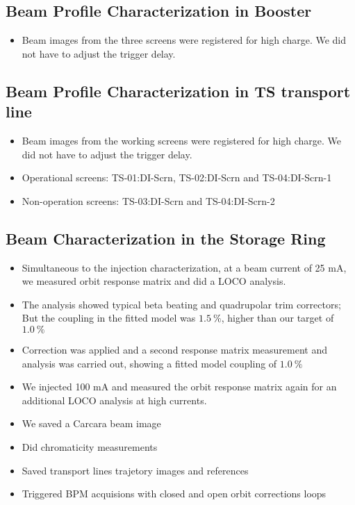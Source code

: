 \documentclass{article}
\begin{document}
\subsection{Beam Profile Characterization in Booster}
\begin{itemize}
    \item Beam images from the three screens were registered for high charge. We did not have to adjust the trigger delay.
\end{itemize}

\subsection{Beam Profile Characterization in TS transport line}
\begin{itemize}
    \item Beam images from the working screens were registered for high charge. We did not have to adjust the trigger delay.
    \item Operational screens: TS-01:DI-Scrn, TS-02:DI-Scrn and TS-04:DI-Scrn-1
    \item Non-operation screens: TS-03:DI-Scrn and TS-04:DI-Scrn-2
\end{itemize}

\subsection{Beam Characterization in the Storage Ring}
\begin{itemize}
    \item Simultaneous to the injection characterization, at a beam current of 25 mA, we measured orbit response matrix and did a LOCO analysis.
    \item The analysis showed typical beta beating and quadrupolar trim correctors; But the coupling in the fitted model was $\SI{1.5}{\percent}$, higher than our target of $\SI{1.0}{\percent}$
    \item Correction was applied and a second response matrix measurement and analysis was carried out, showing a fitted model coupling of $\SI{1.0}{\percent}$
    \item We injected 100 mA and measured the orbit response matrix again for an additional LOCO analysis at high currents.
    \item We saved a Carcara beam image
    \item Did chromaticity measurements
    \item Saved transport lines trajetory images and references
    \item Triggered BPM acquisions with closed and open orbit corrections loops    
\end{itemize}
\end{document}
